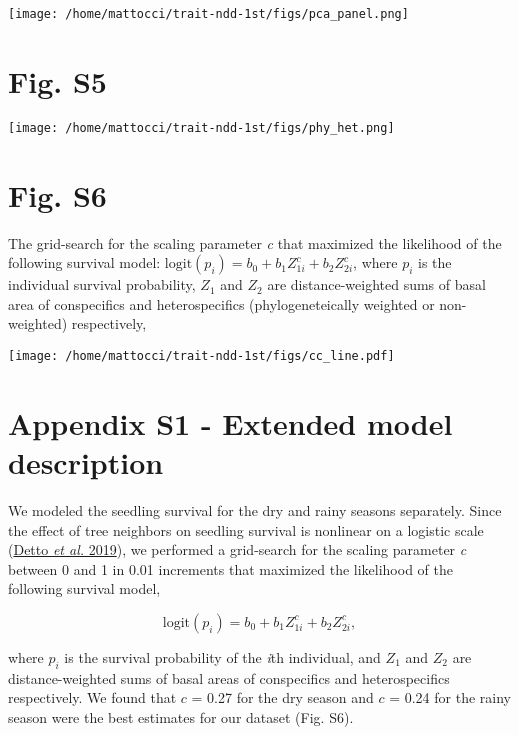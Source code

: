\documentclass[
  12pt,
  letterpaper,
  DIV=11,
  numbers=noendperiod]{scrartcl}
\begin{document}
\texttt{[image: /home/mattocci/trait-ndd-1st/figs/pca\_panel.png]}

\newpage

\hypertarget{fig.-s5}{%
\section{Fig. S5}\label{fig.-s5}}

\texttt{[image: /home/mattocci/trait-ndd-1st/figs/phy\_het.png]}

\newpage

\hypertarget{fig.-s6}{%
\section{Fig. S6}\label{fig.-s6}}

The grid-search for the scaling parameter \emph{c} that maximized the
likelihood of the following survival model:
\(\mathrm{logit}(p_i) = b_0 + b_1 Z_{1i}^c + b_2 Z_{2i}^c\), where
\(p_i\) is the individual survival probability, \(Z_1\) and \(Z_2\) are
distance-weighted sums of basal area of conspecifics and heterospecifics
(phylogeneteically weighted or non-weighted) respectively,

\texttt{[image: /home/mattocci/trait-ndd-1st/figs/cc\_line.pdf]}

\newpage

\hypertarget{appendix-s1---extended-model-description}{%
\section{Appendix S1 - Extended model
description}\label{appendix-s1---extended-model-description}}

We modeled the seedling survival for the dry and rainy seasons
separately. Since the effect of tree neighbors on seedling survival is
nonlinear on a logistic scale (\protect\hyperlink{ref-Detto2019}{Detto
\emph{et al.} 2019}), we performed a grid-search for the scaling
parameter \emph{c} between 0 and 1 in 0.01 increments that maximized the
likelihood of the following survival model,

\[
\mathrm{logit}(p_i) = b_0 + b_1 Z_{1i}^c + b_2 Z_{2i}^c,
\]

where \(p_i\) is the survival probability of the \emph{i}th individual,
and \(Z_1\) and \(Z_2\) are distance-weighted sums of basal areas of
conspecifics and heterospecifics respectively. We found that \(c\) =
0.27 for the dry season and \(c\) = 0.24 for the rainy season were the
best estimates for our dataset (Fig. S6).
\end{document}
